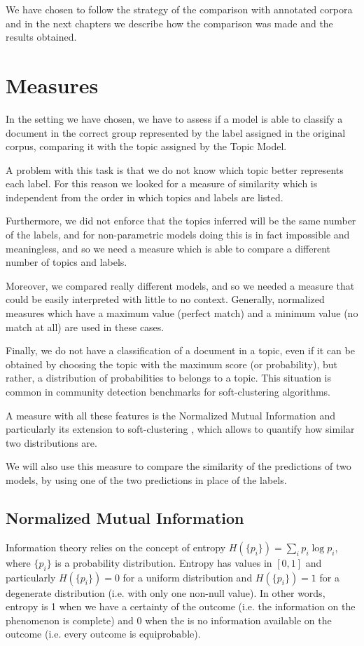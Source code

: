 \documentclass[11pt, a4paper, oneside, openright]{book}
\begin{document}
We have chosen to follow the strategy of the comparison with annotated corpora and in the next chapters we describe how the comparison was made and the results obtained.

\section{Measures}
In the setting we have chosen, we have to assess if a model is able to classify a document in the correct group represented by the label assigned in the original corpus, comparing it with the topic assigned by the Topic Model. 

A problem with this task is that we do not know which topic better represents each label. For this reason we looked for a measure of similarity which is independent from the order in which topics and labels are listed.

Furthermore, we did not enforce that the topics inferred will be the same number of the labels, and for non-parametric models doing this is in fact impossible and meaningless, and so we need a measure which is able to compare a different number of topics and labels.

Moreover, we compared really different models, and so we needed a measure that could be easily interpreted with little to no context. Generally, normalized measures which have a maximum value (perfect match) and a minimum value (no match at all) are used in these cases.

Finally, we do not have a classification of a document in a topic, even if it can be obtained by choosing the topic with the maximum score (or probability), but rather, a distribution of probabilities to belongs to a topic. This situation is common in community detection benchmarks for soft-clustering algorithms.

A measure with all these features is the Normalized Mutual Information \parencite{vinh2010} and particularly its extension to soft-clustering \parencite{lei2014}, which allows to quantify how similar two distributions are.

We will also use this measure to compare the similarity of the predictions of two models, by using one of the two predictions in place of the labels.

\subsection{Normalized Mutual Information}
Information theory relies on the concept of entropy $H(\{p_i\}) = \sum_i p_i \log p_i$, where $\{p_i\}$ is a probability distribution.
Entropy has values in $[0,1]$ and particularly $H(\{p_i\}) = 0$ for a uniform distribution and $H(\{p_i\}) = 1$ for a degenerate distribution (i.e. with only one non-null value).
In other words, entropy is 1 when we have a certainty of the outcome (i.e. the information on the phenomenon is complete) and 0 when the is no information available on the outcome (i.e. every outcome is equiprobable).
\end{document}
